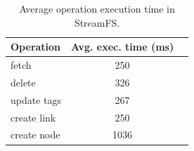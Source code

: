 \begin{table}
\begin{center}
  \begin{tabular}{| l | c  c | }
    \hline
    {\textbf Operation } & {\textbf Avg. exec. time (ms) } &\\ \hline
    fetch & 250 &\\ \hline
    delete & 326  &\\ \hline
    update tags & 267  &\\ \hline
    create link & 250  &\\ \hline
    create node & 1036  &\\ 
    \hline
  \end{tabular}
\caption{Average operation execution time in StreamFS.}
\label{tab:optimes}
\end{center}
\end{table}















